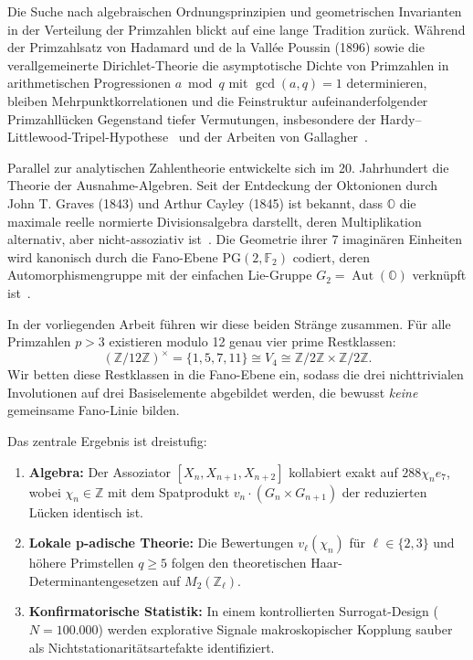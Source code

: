 \documentclass[11pt,a4paper]{article}
\theoremstyle{plain}
\theoremstyle{definition}
\theoremstyle{remark}
\DeclareMathOperator{\Aut}{Aut}
\begin{document}
Die Suche nach algebraischen Ordnungsprinzipien und geometrischen Invarianten in der Verteilung der Primzahlen blickt auf eine lange Tradition zurück. Während der Primzahlsatz von Hadamard und de la Vallée Poussin (1896) sowie die verallgemeinerte Dirichlet-Theorie die asymptotische Dichte von Primzahlen in arithmetischen Progressionen $a \bmod q$ mit $\gcd(a, q) = 1$ determinieren, bleiben Mehrpunktkorrelationen und die Feinstruktur aufeinanderfolgender Primzahllücken Gegenstand tiefer Vermutungen, insbesondere der Hardy--Littlewood-Tripel-Hypothese~\cite{HardyLittlewood1923} und der Arbeiten von Gallagher~\cite{Gallagher1976}.

Parallel zur analytischen Zahlentheorie entwickelte sich im 20. Jahrhundert die Theorie der Ausnahme-Algebren. Seit der Entdeckung der Oktonionen durch John T. Graves (1843) und Arthur Cayley (1845) ist bekannt, dass $\mathbb{O}$ die maximale reelle normierte Divisionsalgebra darstellt, deren Multiplikation alternativ, aber nicht-assoziativ ist~\cite{Baez2002}. Die Geometrie ihrer 7 imaginären Einheiten wird kanonisch durch die Fano-Ebene $\mathrm{PG}(2, \mathbb{F}_2)$ codiert, deren Automorphismengruppe mit der einfachen Lie-Gruppe $G_2 = \Aut(\mathbb{O})$ verknüpft ist~\cite{ConwaySmith2003}.

In der vorliegenden Arbeit führen wir diese beiden Stränge zusammen. Für alle Primzahlen $p > 3$ existieren modulo 12 genau vier prime Restklassen:
\begin{equation}
(\mathbb{Z}/12\mathbb{Z})^\times = \{1, 5, 7, 11\} \cong V_4 \cong \mathbb{Z}/2\mathbb{Z} \times \mathbb{Z}/2\mathbb{Z}.
\end{equation}
Wir betten diese Restklassen in die Fano-Ebene ein, sodass die drei nichttrivialen Involutionen auf drei Basiselemente abgebildet werden, die bewusst \emph{keine} gemeinsame Fano-Linie bilden.

Das zentrale Ergebnis ist dreistufig:
\begin{enumerate}
    \item \textbf{Algebra:} Der Assoziator $[X_n, X_{n+1}, X_{n+2}]$ kollabiert exakt auf $288 \chi_n e_7$, wobei $\chi_n \in \mathbb{Z}$ mit dem Spatprodukt $v_n \cdot (G_n \times G_{n+1})$ der reduzierten Lücken identisch ist.
    \item \textbf{Lokale p-adische Theorie:} Die Bewertungen $v_\ell(\chi_n)$ für $\ell \in \{2,3\}$ und höhere Primstellen $q \ge 5$ folgen den theoretischen Haar-Determinantengesetzen auf $M_2(\mathbb{Z}_\ell)$.
    \item \textbf{Konfirmatorische Statistik:} In einem kontrollierten Surrogat-Design ($N=100.000$) werden explorative Signale makroskopischer Kopplung sauber als Nichtstationaritätsartefakte identifiziert.
\end{enumerate}
\end{document}
